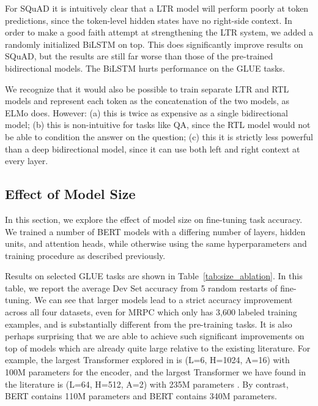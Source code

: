 \documentclass[11pt,a4paper]{article}
\newcommand\bertbase{BERT\xspace}
\newcommand\bertlarge{BERT\xspace}
\begin{document}
For SQuAD it is intuitively clear that a LTR model will perform poorly at token predictions, since the token-level hidden states have no right-side context.
In order to make a good faith attempt at strengthening the LTR system, we added a randomly initialized BiLSTM on top. This does significantly improve results on SQuAD, but the results are still far worse than those of the pre-trained bidirectional models. The BiLSTM hurts performance on the GLUE tasks. 

We recognize that it would also be possible to train separate LTR and RTL models and represent each token as the concatenation of the two models, as ELMo does. However: (a) this is twice as expensive as a single bidirectional model; (b) this is non-intuitive for tasks like QA, since the RTL model would not be able to condition the answer on the question; (c) this it is strictly less powerful than a deep bidirectional model, since it can use both left and right context at every layer.


\subsection{Effect of Model Size}
\label{sec:model_size_ablation}

In this section, we explore the effect of model size on fine-tuning task accuracy. We trained a number of BERT models with a differing number of layers, hidden units, and attention heads, while otherwise using the same hyperparameters and training procedure as described previously.

Results on selected GLUE tasks are shown in Table~\ref{tab:size_ablation}. In this table, we report the average Dev Set accuracy from 5 random restarts of fine-tuning. We can see that larger models lead to a strict accuracy improvement across all four datasets, even for MRPC which only has 3,600 labeled training examples, and is substantially different from the pre-training tasks. It is also perhaps surprising that we are able to achieve such significant improvements on top of models which are already quite large relative to the existing literature. For example, the largest Transformer explored in \citet{vaswani-etal:2017:_atten} is (L=6, H=1024, A=16) with 100M parameters for the encoder, and the largest Transformer we have found in the literature is (L=64, H=512, A=2) with 235M parameters \cite{alrfou:2018}. By contrast, \bertbase contains 110M parameters and \bertlarge contains 340M parameters.
\end{document}

